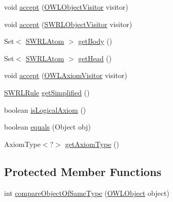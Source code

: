 \begin{DoxyCompactItemize}
\item 
void \hyperlink{classuk_1_1ac_1_1manchester_1_1cs_1_1owl_1_1owlapi_1_1_s_w_r_l_rule_impl_ad91fb17b157287b5d01aa80ff4109663}{accept} (\hyperlink{interfaceorg_1_1semanticweb_1_1owlapi_1_1model_1_1_o_w_l_object_visitor}{O\-W\-L\-Object\-Visitor} visitor)
\item 
void \hyperlink{classuk_1_1ac_1_1manchester_1_1cs_1_1owl_1_1owlapi_1_1_s_w_r_l_rule_impl_a22d88de8b09f6b9a83d9216341c72995}{accept} (\hyperlink{interfaceorg_1_1semanticweb_1_1owlapi_1_1model_1_1_s_w_r_l_object_visitor}{S\-W\-R\-L\-Object\-Visitor} visitor)
\item 
Set$<$ \hyperlink{interfaceorg_1_1semanticweb_1_1owlapi_1_1model_1_1_s_w_r_l_atom}{S\-W\-R\-L\-Atom} $>$ \hyperlink{classuk_1_1ac_1_1manchester_1_1cs_1_1owl_1_1owlapi_1_1_s_w_r_l_rule_impl_a97b18fee8f7f936f79c1a4bd7fe5d244}{get\-Body} ()
\item 
Set$<$ \hyperlink{interfaceorg_1_1semanticweb_1_1owlapi_1_1model_1_1_s_w_r_l_atom}{S\-W\-R\-L\-Atom} $>$ \hyperlink{classuk_1_1ac_1_1manchester_1_1cs_1_1owl_1_1owlapi_1_1_s_w_r_l_rule_impl_a9aef5f9571c6076e769d86b492a88ecf}{get\-Head} ()
\item 
void \hyperlink{classuk_1_1ac_1_1manchester_1_1cs_1_1owl_1_1owlapi_1_1_s_w_r_l_rule_impl_a353691bd627c461c35fb788b9715bb76}{accept} (\hyperlink{interfaceorg_1_1semanticweb_1_1owlapi_1_1model_1_1_o_w_l_axiom_visitor}{O\-W\-L\-Axiom\-Visitor} visitor)
\item 
\hyperlink{interfaceorg_1_1semanticweb_1_1owlapi_1_1model_1_1_s_w_r_l_rule}{S\-W\-R\-L\-Rule} \hyperlink{classuk_1_1ac_1_1manchester_1_1cs_1_1owl_1_1owlapi_1_1_s_w_r_l_rule_impl_a0ffb39504ff7adce418b503bf5978bde}{get\-Simplified} ()
\item 
boolean \hyperlink{classuk_1_1ac_1_1manchester_1_1cs_1_1owl_1_1owlapi_1_1_s_w_r_l_rule_impl_acd38e231b636d7e3abb59237601b4ed8}{is\-Logical\-Axiom} ()
\item 
boolean \hyperlink{classuk_1_1ac_1_1manchester_1_1cs_1_1owl_1_1owlapi_1_1_s_w_r_l_rule_impl_a5da7a9b0a65be8900b0d91d1bb40aa1a}{equals} (Object obj)
\item 
Axiom\-Type$<$?$>$ \hyperlink{classuk_1_1ac_1_1manchester_1_1cs_1_1owl_1_1owlapi_1_1_s_w_r_l_rule_impl_a8d07f38697951526f86113ba61941179}{get\-Axiom\-Type} ()
\end{DoxyCompactItemize}
\subsection*{Protected Member Functions}
\begin{DoxyCompactItemize}
\item 
int \hyperlink{classuk_1_1ac_1_1manchester_1_1cs_1_1owl_1_1owlapi_1_1_s_w_r_l_rule_impl_adaf47bedd8fa0a6486fb8668e7a246e5}{compare\-Object\-Of\-Same\-Type} (\hyperlink{interfaceorg_1_1semanticweb_1_1owlapi_1_1model_1_1_o_w_l_object}{O\-W\-L\-Object} object)
\end{DoxyCompactItemize}
